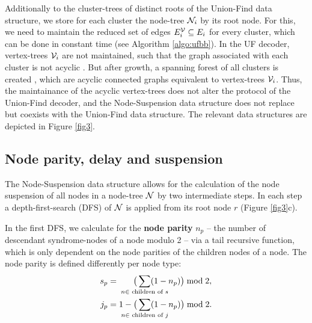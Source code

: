 Additionally to the cluster-trees of distinct roots of the Union-Find data structure, we store for each cluster the node-tree $\mathcal{N}_i$ by its root node. For this, we need to maintain the reduced set of edges $E^{\mathcal{V}}_i \subseteq E_i$ for every cluster, which can be done in constant time (see Algorithm \ref{algo:ufbb}). In the UF decoder, vertex-trees $\mathcal{V}_i$ are not maintained, such that the graph associated with each cluster is not acyclic \cite{delfosse2017almost}. But after growth, a spanning forest of all clusters is created \cite{delfosse2017linear}, which are acyclic connected graphs equivalent to vertex-trees $\mathcal{V}_i$. Thus, the maintainance of the acyclic vertex-trees does not alter the protocol of the Union-Find decoder, and the Node-Suspension data structure does not replace but coexists with the Union-Find data structure. The relevant data structures are depicted in Figure \ref{fig3}. 


\subsection{Node parity, delay and suspension}\label{sec:paritydelaysus}

The Node-Suspension data structure allows for the calculation of the node suspension of all nodes in a node-tree $\mathcal{N}$ by two intermediate steps. In each step a depth-first-search (DFS) of $\mathcal{N}$ is applied from its root node $r$ (Figure \ref{fig3}c).

In the first DFS, we calculate for the \textbf{node parity} $n_p$ -- the number of descendant syndrome-nodes of a node modulo 2 -- via a tail recursive function, which is only dependent on the node parities of the children nodes of a node. The node parity is defined differently per node type:
\begin{align}\label{eq:nodeparity}
    s_p &= \hspace{.6cm}\big( \sum_{\mathclap{n \in \text{ children of } s}} (1-n_p) \big ) \bmod 2,\\
    j_p &= 1 - \big(\sum_{\mathclap{n \in \text{ children of } j}} (1-n_p) \big) \bmod 2.
\end{align}

